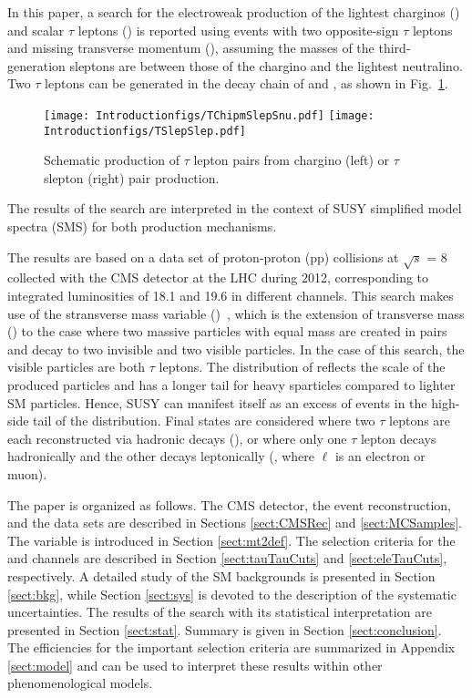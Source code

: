 In this paper, a search for the electroweak production of the lightest charginos (\chione) and scalar $\tau$  leptons (\stau) is reported using events 
with two opposite-sign $\tau$ leptons and 
missing transverse momentum (\MPT), assuming the masses of the third-generation sleptons are between those of the 
chargino and the lightest neutralino. 
Two $\tau$ leptons can be generated in the decay chain of \chione and \sTau, as shown in Fig.~\ref{fig:Productions}. 
\begin{figure}[!htb]
\centering
\texttt{[image: Introductionfigs/TChipmSlepSnu.pdf]}
\texttt{[image: Introductionfigs/TSlepSlep.pdf]}

\caption{Schematic production of $\tau$ lepton pairs from chargino (left) or $\tau$ slepton (right) pair production.}
\label{fig:Productions}
\end{figure}
The results of the search are interpreted in the context of SUSY simplified model spectra (SMS) \cite{Alwall:2008ag,alves:sms} for both
production mechanisms.


The results are based on a data set of proton-proton (pp)
collisions at $\sqrt{s}$ = 8\TeV
collected with the CMS detector at the LHC during 2012, corresponding to integrated
luminosities of 18.1 and 19.6 \invfb in different channels. 
This search makes use of the stransverse mass variable (\mttwo)~\cite{Lester:1999tx,Barr:2003rg},
which is the extension of transverse mass (\mt) to the case 
where two massive particles with equal mass are created in pairs  
and decay to two invisible and two visible particles. 
In the case of this search, the visible particles are both $\tau$ leptons.
The distribution of \mttwo reflects the scale of the produced particles and has a longer tail for heavy sparticles
compared to lighter SM particles. Hence, SUSY 
can manifest itself
as an excess of events in the high-side tail of the \mttwo distribution. 
Final states are considered where
two $\tau$ leptons are each reconstructed via hadronic decays (\tauTau), 
or where only one $\tau$ lepton  decays hadronically and 
the other decays leptonically (\leptonTau, where $\ell$ is an electron or muon). 

The paper is organized as follows.  The CMS detector, the event reconstruction, and the data sets are described
in Sections \ref{sect:CMSRec} and \ref{sect:MCSamples}. The \mttwo variable is introduced in Section \ref{sect:mt2def}. 
The selection criteria for the \tauTau and \leptonTau channels are described in Section \ref{sect:tauTauCuts} and \ref{sect:eleTauCuts}, respectively. 
A detailed study of the SM backgrounds is presented in Section \ref{sect:bkg}, while Section \ref{sect:sys} 
is devoted to the description of the systematic uncertainties.  The results of the search with its statistical interpretation are presented in 
Section \ref{sect:stat}. Summary is given in Section \ref{sect:conclusion}. The efficiencies for the important selection criteria are summarized in Appendix \ref{sect:model} and can be used to interpret these results within other phenomenological models. 




